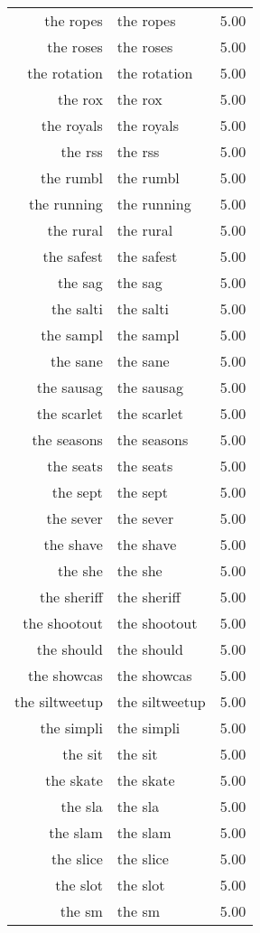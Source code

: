 \begin{table}[ht]
\begin{tabular}{rlr}
  the ropes & the ropes & 5.00 \\ 
  the roses & the roses & 5.00 \\ 
  the rotation & the rotation & 5.00 \\ 
  the rox & the rox & 5.00 \\ 
  the royals & the royals & 5.00 \\ 
  the rss & the rss & 5.00 \\ 
  the rumbl & the rumbl & 5.00 \\ 
  the running & the running & 5.00 \\ 
  the rural & the rural & 5.00 \\ 
  the safest & the safest & 5.00 \\ 
  the sag & the sag & 5.00 \\ 
  the salti & the salti & 5.00 \\ 
  the sampl & the sampl & 5.00 \\ 
  the sane & the sane & 5.00 \\ 
  the sausag & the sausag & 5.00 \\ 
  the scarlet & the scarlet & 5.00 \\ 
  the seasons & the seasons & 5.00 \\ 
  the seats & the seats & 5.00 \\ 
  the sept & the sept & 5.00 \\ 
  the sever & the sever & 5.00 \\ 
  the shave & the shave & 5.00 \\ 
  the she & the she & 5.00 \\ 
  the sheriff & the sheriff & 5.00 \\ 
  the shootout & the shootout & 5.00 \\ 
  the should & the should & 5.00 \\ 
  the showcas & the showcas & 5.00 \\ 
  the siltweetup & the siltweetup & 5.00 \\ 
  the simpli & the simpli & 5.00 \\ 
  the sit & the sit & 5.00 \\ 
  the skate & the skate & 5.00 \\ 
  the sla & the sla & 5.00 \\ 
  the slam & the slam & 5.00 \\ 
  the slice & the slice & 5.00 \\ 
  the slot & the slot & 5.00 \\ 
  the sm & the sm & 5.00 \\ 

\end{tabular}
\end{table}
